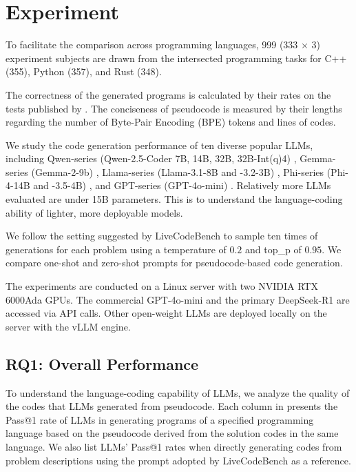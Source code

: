 \section{Experiment}\label{sec:experiment}



To facilitate the comparison across programming languages, 999 (333 $\times$ 3) experiment subjects are drawn from the intersected programming tasks for C++ (355), Python (357), and Rust (348).

The correctness of the generated programs is calculated by their \passk rates on the tests published by \livecb. %
The conciseness of pseudocode is measured by their lengths regarding the number of Byte-Pair Encoding (BPE) tokens and lines of codes.



We study the code generation performance of ten diverse popular LLMs, including Qwen-series (Qwen-2.5-Coder 7B, 14B, 32B, 32B-Int(q)4) \cite{qwen2.5-coder}, Gemma-series (Gemma-2-9b) \cite{google-gemma-2}, Llama-series (Llama-3.1-8B and -3.2-3B) \cite{meta-llama-3-2}, Phi-series (Phi-4-14B and -3.5-4B) \cite{microsoft-phi-4}, and GPT-series (GPT-4o-mini) \cite{gpt-4o-mini-report}. Relatively more LLMs evaluated are under 15B parameters. This is to understand the {language-coding ability} of lighter, more deployable models.%

We follow the setting suggested by LiveCodeBench to sample ten times of generations for each problem using a temperature of $0.2$ and top\_p of $0.95$.
We compare one-shot and zero-shot prompts for pseudocode-based code generation.

The experiments are conducted on a Linux server with two NVIDIA RTX 6000Ada GPUs. The commercial GPT-4o-mini and the primary DeepSeek-R1 are accessed via API calls. Other open-weight LLMs are deployed locally on the server with the vLLM engine.


\subsection{RQ1: Overall Performance}




To understand the {language-coding capability} of LLMs, we analyze the quality of the codes that LLMs generated from pseudocode. 
Each column in  presents the Pass@1 rate of LLMs in generating programs of a specified programming language based on the pseudocode derived from the solution codes in the same language.
We also list LLMs' Pass@1 rates when directly generating codes from problem descriptions using the prompt adopted by LiveCodeBench as a reference.



